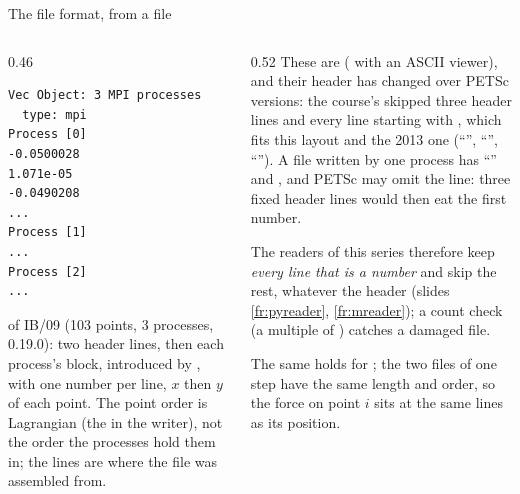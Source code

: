 \documentclass[aspectratio=169,11pt]{beamer}
\begin{document}
\begin{frame}[fragile]{The file format, from a file}
\label{fr:format}
\begin{columns}[T,onlytextwidth]
\begin{column}{0.46\textwidth}
\begin{lstlisting}[style=data]
Vec Object: 3 MPI processes
  type: mpi
Process [0]
-0.0500028
1.071e-05
-0.0490208
...
Process [1]
...
Process [2]
...
\end{lstlisting}
\footnotesize {} of IB/09 (103 points, 3 processes, 0.19.0): two header lines, then each process's block, introduced by , with one number per line, $x$ then $y$ of each point. The point order is Lagrangian (the  in the writer), not the order the processes hold them in; the  lines are where the file was assembled from.
\end{column}
\begin{column}{0.52\textwidth}
\footnotesize These are  ( with an ASCII viewer), and their header has changed over PETSc versions: the course's  skipped three header lines and every line starting with , which fits this layout and the 2013 one (``'', ``'', ``''). A file written by one process has ``'' and , and PETSc may omit the  line: three fixed header lines would then eat the first number.
\vspace{1mm}

\footnotesize The readers of this series therefore keep \emph{every line that is a number} and skip the rest, whatever the header (slides \ref{fr:pyreader}, \ref{fr:mreader}); a count check (a multiple of ) catches a damaged file.
\vspace{1mm}

\footnotesize The same holds for ; the two files of one step have the same length and order, so the force on point $i$ sits at the same lines as its position.
\end{column}
\end{columns}
\end{frame}
\end{document}
